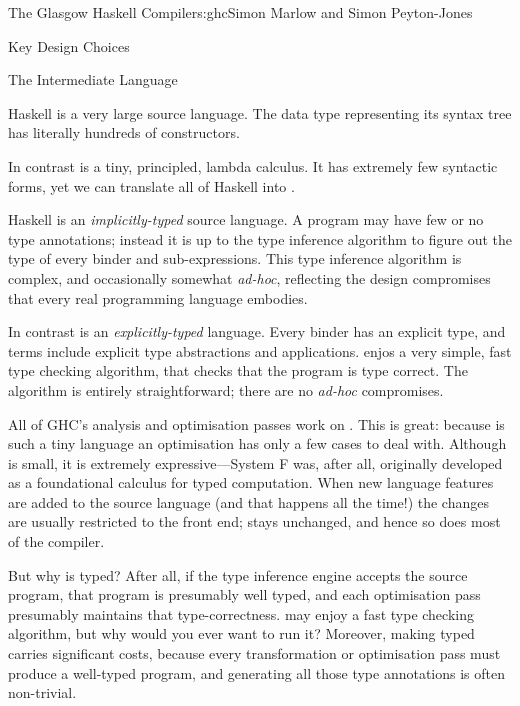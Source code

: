 \begin{aosachapter}{The Glasgow Haskell Compiler}{s:ghc}{Simon Marlow and Simon Peyton-Jones}
\begin{aosasect1}{Key Design Choices}
\begin{aosasect2}{The Intermediate Language}
\begin{aosaitemize}

\item Haskell is a very large source language.  The data type
  representing its syntax tree has literally hundreds of constructors.

  In contrast  is a tiny, principled, lambda calculus.  It has
  extremely few syntactic forms, yet we can translate all of Haskell
  into .

\item Haskell is an \emph{implicitly-typed} source language.  A
  program may have few or no type annotations; instead it is up to the
  type inference algorithm to figure out the type of every binder and
  sub-expressions.  This type inference algorithm is complex, and
  occasionally somewhat \emph{ad-hoc}, reflecting the design
  compromises that every real programming language embodies.

  In contrast  is an \emph{explicitly-typed} language.  Every
  binder has an explicit type, and terms include explicit type
  abstractions and applications.   enjos a very simple, fast
  type checking algorithm, that checks that the program is type
  correct.  The algorithm is entirely straightforward; there are no
  \emph{ad-hoc} compromises.

\end{aosaitemize}

All of GHC's analysis and optimisation passes work on . This is
great: because  is such a tiny language an optimisation has
only a few cases to deal with.  Although  is small, it is
extremely expressive---System F was, after all, originally developed
as a foundational calculus for typed computation.  When new language
features are added to the source language (and that happens all the
time!) the changes are usually restricted to the front end; 
stays unchanged, and hence so does most of the compiler.

But why is  typed?  After all, if the type inference engine
accepts the source program, that program is presumably well typed, and
each optimisation pass presumably maintains that type-correctness.
 may enjoy a fast type checking algorithm, but why would you
ever want to run it?  Moreover, making  typed carries
significant costs, because every transformation or optimisation pass
must produce a well-typed program, and generating all those type
annotations is often non-trivial.


\end{aosasect2}
\end{aosasect1}
\end{aosachapter}
